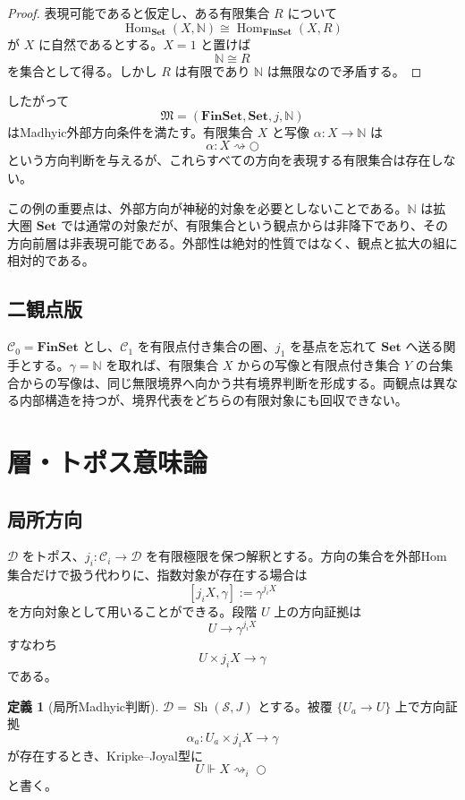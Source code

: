 \documentclass[a4paper,11pt]{ltjsarticle}
\theoremstyle{definition}
\newtheorem{definition}{定義}[section]
\theoremstyle{plain}
\newcommand{\Hom}{\operatorname{Hom}}
\newcommand{\Sh}{\operatorname{Sh}}
\newcommand{\Set}{\mathbf{Set}}
\newcommand{\FinSet}{\mathbf{FinSet}}
\newcommand{\dfix}{\bigcirc}
\begin{document}
\begin{proof}
表現可能であると仮定し、ある有限集合 $R$ について
\[
 \Hom_{\Set}(X,\mathbb N)
 \cong\Hom_{\FinSet}(X,R)
\]
が $X$ に自然であるとする。$X=1$ と置けば
\[
 \mathbb N\cong R
\]
を集合として得る。しかし $R$ は有限であり $\mathbb N$ は無限なので矛盾する。
\end{proof}

したがって
\[
 \mathfrak M=(\FinSet,\Set,j,\mathbb N)
\]
はMadhyic外部方向条件を満たす。有限集合 $X$ と写像 $\alpha:X\to\mathbb N$ は
\[
 \alpha:X\rightsquigarrow\dfix
\]
という方向判断を与えるが、これらすべての方向を表現する有限集合は存在しない。

この例の重要点は、外部方向が神秘的対象を必要としないことである。$\mathbb N$ は拡大圏 $\Set$ では通常の対象だが、有限集合という観点からは非降下であり、その方向前層は非表現可能である。外部性は絶対的性質ではなく、観点と拡大の組に相対的である。

\subsection{二観点版}

$\mathcal C_0=\FinSet$ とし、$\mathcal C_1$ を有限点付き集合の圏、$j_1$ を基点を忘れて $\Set$ へ送る関手とする。$\gamma=\mathbb N$ を取れば、有限集合 $X$ からの写像と有限点付き集合 $Y$ の台集合からの写像は、同じ無限境界へ向かう共有境界判断を形成する。両観点は異なる内部構造を持つが、境界代表をどちらの有限対象にも回収できない。

\section{層・トポス意味論}

\subsection{局所方向}

$\mathcal D$ をトポス、$j_i:\mathcal C_i\to\mathcal D$ を有限極限を保つ解釈とする。方向の集合を外部Hom集合だけで扱う代わりに、指数対象が存在する場合は
\[
 [j_iX,\gamma]:=\gamma^{j_iX}
\]
を方向対象として用いることができる。段階 $U$ 上の方向証拠は
\[
 U\longrightarrow\gamma^{j_iX}
\]
すなわち
\[
 U\times j_iX\longrightarrow\gamma
\]
である。

\begin{definition}[局所Madhyic判断]
$\mathcal D=\Sh(\mathcal S,J)$ とする。被覆 $\{U_a\to U\}$ 上で方向証拠
\[
 \alpha_a:U_a\times j_iX\to\gamma
\]
が存在するとき、Kripke--Joyal型に
\[
 U\Vdash X\rightsquigarrow_i\dfix
\]
と書く。
\end{definition}
\end{document}
